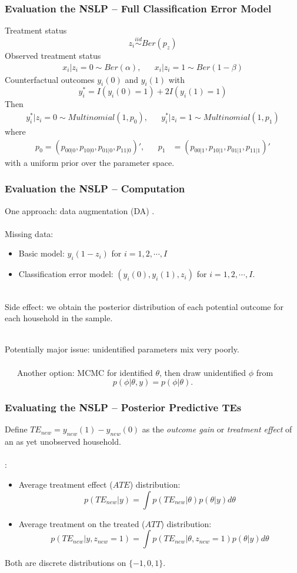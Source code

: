 \documentclass[xcolor=dvipsnames]{beamer}
\begin{document}
\begin{frame}
  \frametitle{Evaluation the NSLP -- Full Classification Error Model}
Treatment status 
\[
z_i\stackrel{iid}{\sim}Ber(p_z)
\]
 Observed treatment status 
\begin{align*}
x_i|z_i=0\sim Ber(\alpha),&&x_i|z_i=1\sim Ber(1-\beta)
\end{align*}
 Counterfactual outcomes $y_i(0)$ and $y_i(1)$ with 
\[
y_i^*=I(y_i(0)=1) + 2I(y_i(1)=1)
\]
Then
\begin{align*}
  y_i^*|z_i=0\sim Multinomial(1,p_0),&& y_i^*|z_i=1\sim Multinomial(1,p_1)
\end{align*}
where
\begin{align*}
  p_0 = (p_{00|0},p_{10|0},p_{01|0},p_{11|0})', &&  p_1 &= (p_{00|1},p_{10|1},p_{01|1},p_{11|1})'
\end{align*}
 with a uniform prior over the parameter space.
\end{frame}

\begin{frame}
\frametitle{Evaluation the NSLP -- Computation}
One approach: data augmentation (DA) \citep{tanner1987calculation}.\\~\\

Missing data:
\begin{itemize}
\item Basic model: $y_i(1-z_i)$ for $i=1,2,\cdots,I$
\item Classification error model: $(y_i(0), y_i(1), z_i)$ for $i=1,2, \cdots,I$.\\~
\end{itemize}

\pause Side effect: we obtain the posterior distribution of each potential outcome for each household in the sample.\\~

\pause Potentially major issue: unidentified parameters mix very poorly. \\~\\
\ \ \ Another option: MCMC for identified $\theta$, then draw unidentified $\phi$ from
\[
p(\phi|\theta,y)=p(\phi|\theta).
\]
\end{frame}


\begin{frame}
    \frametitle{Evaluating the NSLP -- Posterior Predictive TEs}
Define $TE_{new}=y_{new}(1) - y_{new}(0)$ as the {\it outcome gain} or {\it treatment effect} of an as yet unobserved household.\\~\\

\cite{poirier2003predictive}:
\begin{itemize}
\item[] Average treatment effect ($ATE$) distribution: 
  \[
  p(TE_{new}|y) = \int p(TE_{new}|\theta)p(\theta|y)d\theta
  \]
\item[] Average treatment on the treated ($ATT$) distribution: 
  \[
  p(TE_{new}|y,z_{new}=1) = \int p(TE_{new}|\theta, z_{new}=1)p(\theta|y)d\theta
  \]
\end{itemize}
Both are discrete distributions on $\{-1,0,1\}$.
\end{frame}
\end{document}

